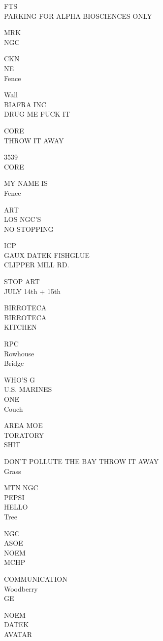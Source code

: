 \documentclass[10pt,letterpaper]{article}
\begin{document}
FTS\\
PARKING FOR ALPHA BIOSCIENCES ONLY

MRK\\
NGC

CKN\\
NE\\
Fence

Wall\\
BIAFRA INC\\
DRUG ME FUCK IT

CORE\\
THROW IT AWAY

3539\\
CORE

MY NAME IS\\
Fence

ART\\
LOS NGC'S\\
NO STOPPING

ICP\\
GAUX DATEK FISHGLUE\\
CLIPPER MILL RD.

STOP ART\\
JULY 14th + 15th

BIRROTECA\\
BIRROTECA\\
KITCHEN

RPC\\
Rowhouse\\
Bridge

WHO'S G\\
U.S. MARINES\\
ONE\\
Couch

AREA MOE\\
TORATORY\\
SHIT

DON'T POLLUTE THE BAY THROW IT AWAY\\
Grass

MTN NGC\\
PEPSI\\
HELLO\\
Tree

NGC\\
ASOE\\
NOEM\\
MCHP

COMMUNICATION\\
Woodberry\\
GE

NOEM\\
DATEK\\
AVATAR
\end{document}
